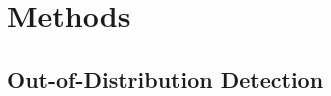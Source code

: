 \section{Methods}
\subsection{Out-of-Distribution Detection}
\label{section: Out-of-Distribution Detection}
